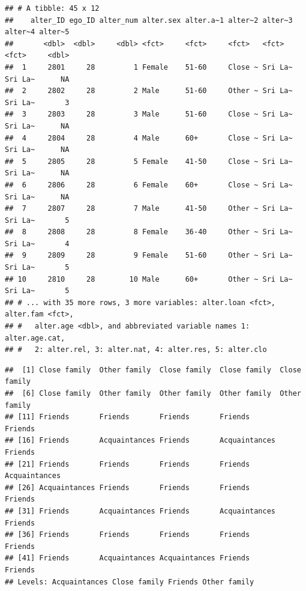 \documentclass[
]{book}
\newenvironment{Shaded}{\begin{snugshade}}{\end{snugshade}}
\newcommand{\CommentTok}[1]{\textcolor[rgb]{0.56,0.35,0.01}{\textit{#1}}}
\newcommand{\FloatTok}[1]{\textcolor[rgb]{0.00,0.00,0.81}{#1}}
\newcommand{\NormalTok}[1]{#1}
\newcommand{\SpecialCharTok}[1]{\textcolor[rgb]{0.00,0.00,0.00}{#1}}
\begin{document}
\begin{verbatim}
## # A tibble: 45 x 12
##    alter_ID ego_ID alter_num alter.sex alter.a~1 alter~2 alter~3 alter~4 alter~5
##       <dbl>  <dbl>     <dbl> <fct>     <fct>     <fct>   <fct>   <fct>     <dbl>
##  1     2801     28         1 Female    51-60     Close ~ Sri La~ Sri La~      NA
##  2     2802     28         2 Male      51-60     Other ~ Sri La~ Sri La~       3
##  3     2803     28         3 Male      51-60     Close ~ Sri La~ Sri La~      NA
##  4     2804     28         4 Male      60+       Close ~ Sri La~ Sri La~      NA
##  5     2805     28         5 Female    41-50     Close ~ Sri La~ Sri La~      NA
##  6     2806     28         6 Female    60+       Close ~ Sri La~ Sri La~      NA
##  7     2807     28         7 Male      41-50     Other ~ Sri La~ Sri La~       5
##  8     2808     28         8 Female    36-40     Other ~ Sri La~ Sri La~       4
##  9     2809     28         9 Female    51-60     Other ~ Sri La~ Sri La~       5
## 10     2810     28        10 Male      60+       Other ~ Sri La~ Sri La~       5
## # ... with 35 more rows, 3 more variables: alter.loan <fct>, alter.fam <fct>,
## #   alter.age <dbl>, and abbreviated variable names 1: alter.age.cat,
## #   2: alter.rel, 3: alter.nat, 4: alter.res, 5: alter.clo
\end{verbatim}

\begin{Shaded}
\end{Shaded}

\begin{verbatim}
##  [1] Close family  Other family  Close family  Close family  Close family 
##  [6] Close family  Other family  Other family  Other family  Other family 
## [11] Friends       Friends       Friends       Friends       Friends      
## [16] Friends       Acquaintances Friends       Acquaintances Friends      
## [21] Friends       Friends       Friends       Friends       Acquaintances
## [26] Acquaintances Friends       Friends       Friends       Friends      
## [31] Friends       Acquaintances Friends       Acquaintances Friends      
## [36] Friends       Friends       Friends       Friends       Friends      
## [41] Friends       Acquaintances Acquaintances Friends       Friends      
## Levels: Acquaintances Close family Friends Other family
\end{verbatim}
\end{document}
